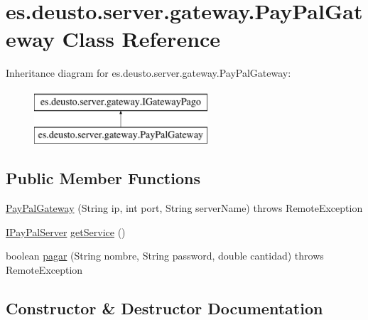 \hypertarget{classes_1_1deusto_1_1server_1_1gateway_1_1_pay_pal_gateway}{}\section{es.\+deusto.\+server.\+gateway.\+Pay\+Pal\+Gateway Class Reference}
\label{classes_1_1deusto_1_1server_1_1gateway_1_1_pay_pal_gateway}
Inheritance diagram for es.\+deusto.\+server.\+gateway.\+Pay\+Pal\+Gateway\+:\begin{figure}[H]
\begin{center}
\leavevmode
\includegraphics[height=2.000000cm]{classes_1_1deusto_1_1server_1_1gateway_1_1_pay_pal_gateway}
\end{center}
\end{figure}
\subsection*{Public Member Functions}
\begin{DoxyCompactItemize}
\item 
\mbox{\hyperlink{classes_1_1deusto_1_1server_1_1gateway_1_1_pay_pal_gateway_ae2a308a408b0a1027aca4e5716a8a956}{Pay\+Pal\+Gateway}} (String ip, int port, String server\+Name)  throws Remote\+Exception 
\item 
\mbox{\hyperlink{interfacees_1_1deusto_1_1paypal_1_1server_1_1_i_pay_pal_server}{I\+Pay\+Pal\+Server}} \mbox{\hyperlink{classes_1_1deusto_1_1server_1_1gateway_1_1_pay_pal_gateway_ab6c1db972e19740c278d32abc7883fb6}{get\+Service}} ()
\item 
boolean \mbox{\hyperlink{classes_1_1deusto_1_1server_1_1gateway_1_1_pay_pal_gateway_a001d981b8bc619f54230b669475d41b6}{pagar}} (String nombre, String password, double cantidad)  throws Remote\+Exception 
\end{DoxyCompactItemize}


\subsection{Constructor \& Destructor Documentation}
\mbox{\label{classes_1_1deusto_1_1server_1_1gateway_1_1_pay_pal_gateway_ae2a308a408b0a1027aca4e5716a8a956}} 
